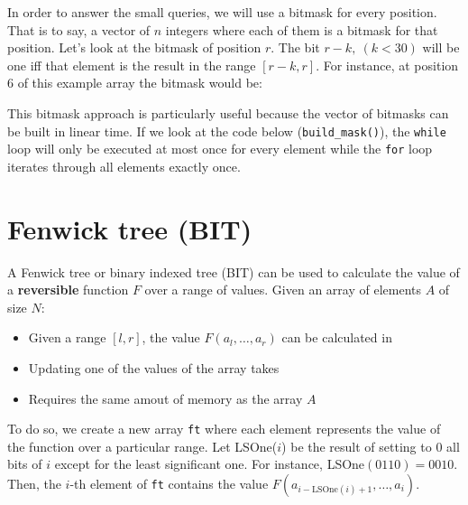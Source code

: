 \begin{figure}[h!]
		\centering
\end{figure}
\newpage
In order to answer the small queries, we will use a bitmask for every position. That
is to say, a vector of $n$ integers where each of them is a bitmask for that position.
Let's look at the bitmask of position $r$. The bit $r-k, \ (k<30)$ will 
be one iff that element is the result in the range $[r-k, r]$.  
For instance, at position $6$ of this example array the bitmask would be:
\begin{figure}[h!]
\centering
{}
\end{figure}
This bitmask approach is particularly useful because the vector of bitmasks can be built in linear time. 
If we look at the code below (\texttt{build\_mask()}), the \texttt{while} loop 
will only be executed at most once for every element while 
the \texttt{for} loop iterates through all elements exactly once.





\newpage
\section{Fenwick tree (BIT)}
A Fenwick tree or binary indexed tree (BIT) can be used to calculate the value
of a \textbf{reversible} function $F$ over a range of values. Given an array of elements
$A$ of size $N$:
\begin{itemize}
		\setlength{\itemsep}{2pt}
		\item Given a range $[l,r]$, the value $F(a_l,\dots, a_r)$ can be calculated
				in 
		\item Updating one of the values of the array takes 
		\item Requires the same amout of memory as the array $A$
\end{itemize}
To do so, we create a new array \texttt{ft} where each element represents
the value of the function over a particular range. Let LSOne($i$) be the 
result of setting to 0 all bits of $i$ except for the least significant one.
For instance, LSOne$(0110)=0010$. Then, the $i$-th element of \texttt{ft} 
contains the value $F(a_{i-\text{LSOne}(i)+1},\dots, a_{i})$. 

